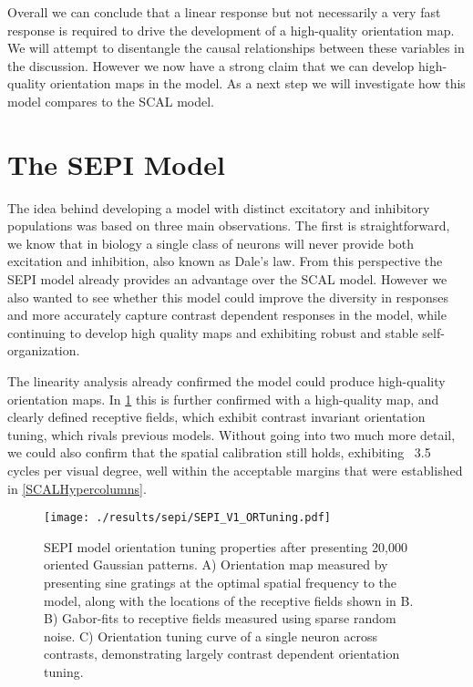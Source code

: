 Overall we can conclude that a linear response but not necessarily a
very fast response is required to drive the development of a
high-quality orientation map. We will attempt to disentangle the
causal relationships between these variables in the
discussion. However we now have a strong claim that we can develop
high-quality orientation maps in the model. As a next step we will
investigate how this model compares to the SCAL model.

\section{The SEPI Model}

The idea behind developing a model with distinct excitatory and
inhibitory populations was based on three main observations. The first
is straightforward, we know that in biology a single class of neurons
will never provide both excitation and inhibition, also known as
Dale's law. From this perspective the SEPI model already provides an
advantage over the SCAL model. However we also wanted to see whether
this model could improve the diversity in responses and more
accurately capture contrast dependent responses in the model, while
continuing to develop high quality maps and exhibiting robust and
stable self-organization.

The linearity analysis already confirmed the model could produce
high-quality orientation maps. In \ref{SEPIORTuning} this is further
confirmed with a high-quality map, and clearly defined receptive
fields, which exhibit contrast invariant orientation tuning, which
rivals previous models. Without going into two much more detail, we
could also confirm that the spatial calibration still holds,
exhibiting ~3.5 cycles per visual degree, well within the acceptable
margins that were established in \ref{SCALHypercolumns}.

\begin{figure}
	\centering
    \texttt{[image: ./results/sepi/SEPI\_V1\_ORTuning.pdf]}
	\caption{SEPI model orientation tuning properties after presenting
      20,000 oriented Gaussian patterns. A) Orientation map measured
      by presenting sine gratings at the optimal spatial frequency to
      the model, along with the locations of the receptive fields
      shown in B. B) Gabor-fits to receptive fields measured using
      sparse random noise. C) Orientation tuning curve of a single
      neuron across contrasts, demonstrating largely contrast
      dependent orientation tuning.}
	\label{SEPIORTuning}
\end{figure}

